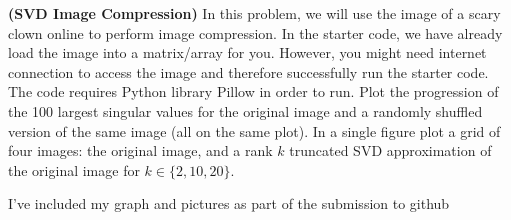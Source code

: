 \documentclass[12pt,letterpaper,fleqn]{hmcpset}
\begin{document}
\begin{problem}[2]
\textbf{(SVD Image Compression)}
In this problem, we will use the image of a scary clown online to perform image compression.  In the starter code, we have already load the image into a matrix/array for you. However, you might need internet connection to access the image and therefore successfully run the starter code. The code requires Python library Pillow in order to run.
\newline
\newline 
Plot the progression of the 100 largest singular values for the original image
and a randomly shuffled version of the same image (all on the same plot). In a single figure plot
a grid of four images: the original image, and a rank $k$ truncated SVD approximation of the original
image for $k\in\{2,10,20\}$.

\end{problem}
\begin{solution}
I've included my graph and pictures as part of the submission to github
\end{solution}
\newpage
\end{document}
